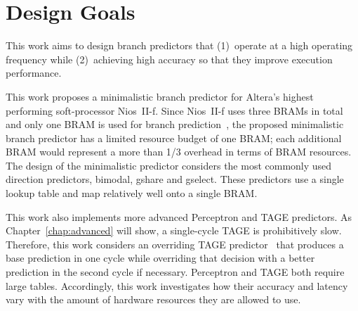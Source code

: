\section{Design Goals}
\label{sec:background:goal}

This work aims to design branch predictors that (1)~operate at a high operating frequency while (2)~achieving high accuracy so that they improve execution performance.

This work proposes a minimalistic branch predictor for Altera's highest performing soft-processor Nios~II-f. Since Nios~II-f uses three BRAMs in total and only one BRAM is used for branch prediction~\cite{niosiif}, the proposed minimalistic branch predictor has a limited resource budget of one BRAM; each additional BRAM would represent a more than 1/3 overhead in terms of BRAM resources. The design of the minimalistic predictor considers the most commonly used direction predictors, bimodal, gshare and gselect. These predictors use a single lookup table and map relatively well onto a single BRAM.

This work also implements more advanced Perceptron and TAGE predictors. As Chapter~\ref{chap:advanced} will show, a single-cycle TAGE is prohibitively slow. Therefore, this work considers an overriding TAGE predictor~\cite{override} that produces a base prediction in one cycle while overriding that decision with a better prediction in the second cycle if necessary. Perceptron and TAGE both require large tables. Accordingly, this work investigates how their accuracy and latency vary with the amount of hardware resources they are allowed to use.


